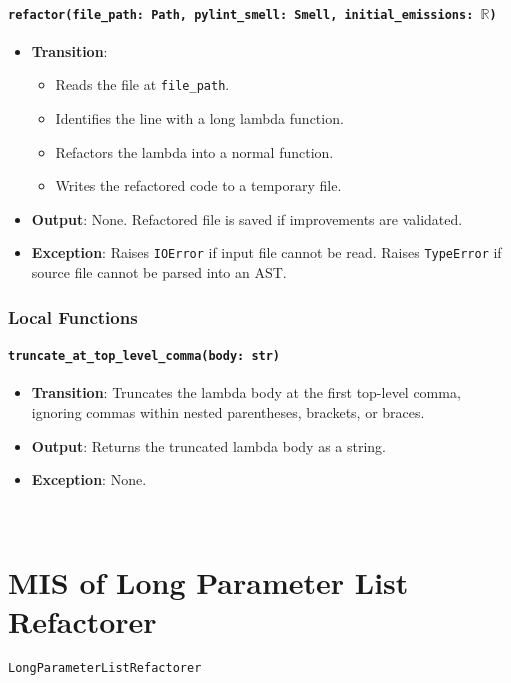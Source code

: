 \documentclass[12pt, titlepage]{article}
\begin{document}
\paragraph{\texttt{refactor(file\_path: Path, pylint\_smell: Smell, initial\_emissions: $\mathbb{R}$)}}
\begin{itemize}
  \item \textbf{Transition}:
    \begin{itemize}
    \item Reads the file at \texttt{file\_path}.
    \item Identifies the line with a long lambda function.
    \item Refactors the lambda into a normal function.
    \item Writes the refactored code to a temporary file.
    \end{itemize}
  \item \textbf{Output}: None. Refactored file is saved if improvements are validated.
  \item \textbf{Exception}: Raises \texttt{IOError} if input file cannot be read. Raises \texttt{TypeError} if source file cannot be parsed into an AST.
\end{itemize}

\subsubsection{Local Functions}
\paragraph{\texttt{truncate\_at\_top\_level\_comma(body: str)}}
\begin{itemize}
\item \textbf{Transition}: Truncates the lambda body at the first top-level comma, ignoring commas within nested parentheses, brackets, or braces.
\item \textbf{Output}: Returns the truncated lambda body as a string.
\item \textbf{Exception}: None.
\end{itemize}

~\newpage

\section{MIS of Long Parameter List Refactorer} \label{Module} 

\texttt{LongParameterListRefactorer}
\end{document}
